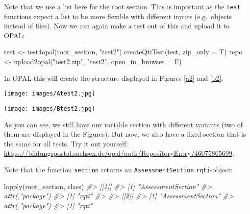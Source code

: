 \documentclass[twoside]{tufte-book}
\newenvironment{Shaded}{}{}
\newcommand{\AttributeTok}[1]{\textcolor[rgb]{0.49,0.56,0.16}{#1}}
\newcommand{\CommentTok}[1]{\textcolor[rgb]{0.38,0.63,0.69}{\textit{#1}}}
\newcommand{\FunctionTok}[1]{\textcolor[rgb]{0.02,0.16,0.49}{#1}}
\newcommand{\NormalTok}[1]{#1}
\newcommand{\OtherTok}[1]{\textcolor[rgb]{0.00,0.44,0.13}{#1}}
\newcommand{\StringTok}[1]{\textcolor[rgb]{0.25,0.44,0.63}{#1}}
\begin{document}
Note that we use a list here for the root section. This is important as the \texttt{test} functions expect a list to be more flexible with different inputs (e.g.~objects instead of files). Now we can again make a test out of this and upload it to OPAL:

\begin{Shaded}
\begin{Highlighting}[]
\NormalTok{test }\OtherTok{\textless{}{-}} \FunctionTok{test4opal}\NormalTok{(root\_section, }\StringTok{"test2"}\NormalTok{)}
\FunctionTok{createQtiTest}\NormalTok{(test, }\AttributeTok{zip\_only =}\NormalTok{ T)}
\NormalTok{repo }\OtherTok{\textless{}{-}} \FunctionTok{upload2opal}\NormalTok{(}\StringTok{"test2.zip"}\NormalTok{, }\StringTok{"test2"}\NormalTok{, }\AttributeTok{open\_in\_browser =}\NormalTok{ F)}
\end{Highlighting}
\end{Shaded}

In OPAL this will create the structure displayed in Figures \ref{a2} and \ref{b2}.

\begin{figure*}
\centering
\texttt{[image: images/Atest2.jpg]}
\caption{\label{a2}Test structure with one fixed section, seed 9808.}
\end{figure*}

\begin{figure*}
\centering
\texttt{[image: images/Btest2.jpg]}
\caption{\label{b2}Test structure with one fixed section, for seed 8833.}
\end{figure*}

As you can see, we still have our variable section with different variants (two of them are displayed in the Figures). But now, we also have a fixed section that is the same for all tests. Try it out yourself: \url{https://bildungsportal.sachsen.de/opal/auth/RepositoryEntry/46075805699}.

Note that the function \texttt{section} returns an \texttt{AssessmentSection} \texttt{rqti}-object:

\begin{Shaded}
\begin{Highlighting}[]
\FunctionTok{lapply}\NormalTok{(root\_section, class)}
\CommentTok{\#\textgreater{} [[1]]}
\CommentTok{\#\textgreater{} [1] "AssessmentSection"}
\CommentTok{\#\textgreater{} attr(,"package")}
\CommentTok{\#\textgreater{} [1] "rqti"}
\CommentTok{\#\textgreater{} }
\CommentTok{\#\textgreater{} [[2]]}
\CommentTok{\#\textgreater{} [1] "AssessmentSection"}
\CommentTok{\#\textgreater{} attr(,"package")}
\CommentTok{\#\textgreater{} [1] "rqti"}
\end{Highlighting}
\end{Shaded}
\end{document}
